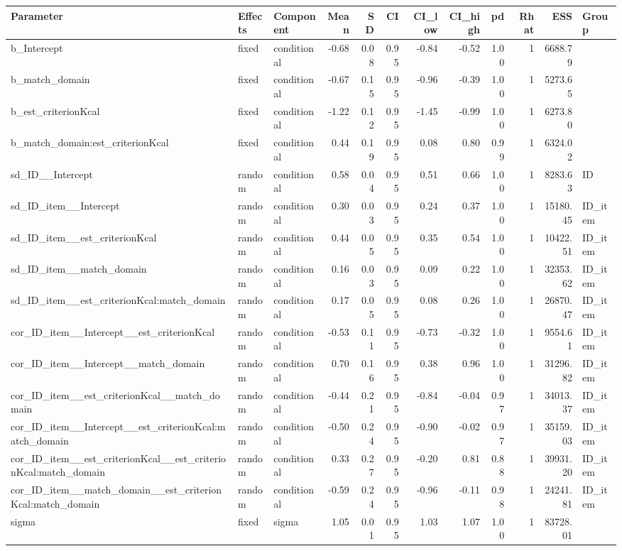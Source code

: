 \documentclass[
  letterpaper,
  DIV=11,
  numbers=noendperiod]{scrartcl}
\begin{document}
\begin{longtable*}[t]{lllrrrrrrrrl}
\toprule
Parameter & Effects & Component & Mean & SD & CI & CI\_low & CI\_high & pd & Rhat & ESS & Group\\
\midrule
b\_Intercept & fixed & conditional & -0.68 & 0.08 & 0.95 & -0.84 & -0.52 & 1.00 & 1 & 6688.79 & \\
b\_match\_domain & fixed & conditional & -0.67 & 0.15 & 0.95 & -0.96 & -0.39 & 1.00 & 1 & 5273.65 & \\
b\_est\_criterionKcal & fixed & conditional & -1.22 & 0.12 & 0.95 & -1.45 & -0.99 & 1.00 & 1 & 6273.80 & \\
b\_match\_domain:est\_criterionKcal & fixed & conditional & 0.44 & 0.19 & 0.95 & 0.08 & 0.80 & 0.99 & 1 & 6324.02 & \\
sd\_ID\_\_Intercept & random & conditional & 0.58 & 0.04 & 0.95 & 0.51 & 0.66 & 1.00 & 1 & 8283.63 & ID\\
\addlinespace
sd\_ID\_item\_\_Intercept & random & conditional & 0.30 & 0.03 & 0.95 & 0.24 & 0.37 & 1.00 & 1 & 15180.45 & ID\_item\\
sd\_ID\_item\_\_est\_criterionKcal & random & conditional & 0.44 & 0.05 & 0.95 & 0.35 & 0.54 & 1.00 & 1 & 10422.51 & ID\_item\\
sd\_ID\_item\_\_match\_domain & random & conditional & 0.16 & 0.03 & 0.95 & 0.09 & 0.22 & 1.00 & 1 & 32353.62 & ID\_item\\
sd\_ID\_item\_\_est\_criterionKcal:match\_domain & random & conditional & 0.17 & 0.05 & 0.95 & 0.08 & 0.26 & 1.00 & 1 & 26870.47 & ID\_item\\
cor\_ID\_item\_\_Intercept\_\_est\_criterionKcal & random & conditional & -0.53 & 0.11 & 0.95 & -0.73 & -0.32 & 1.00 & 1 & 9554.61 & ID\_item\\
\addlinespace
cor\_ID\_item\_\_Intercept\_\_match\_domain & random & conditional & 0.70 & 0.16 & 0.95 & 0.38 & 0.96 & 1.00 & 1 & 31296.82 & ID\_item\\
cor\_ID\_item\_\_est\_criterionKcal\_\_match\_domain & random & conditional & -0.44 & 0.21 & 0.95 & -0.84 & -0.04 & 0.97 & 1 & 34013.37 & ID\_item\\
cor\_ID\_item\_\_Intercept\_\_est\_criterionKcal:match\_domain & random & conditional & -0.50 & 0.24 & 0.95 & -0.90 & -0.02 & 0.97 & 1 & 35159.03 & ID\_item\\
cor\_ID\_item\_\_est\_criterionKcal\_\_est\_criterionKcal:match\_domain & random & conditional & 0.33 & 0.27 & 0.95 & -0.20 & 0.81 & 0.88 & 1 & 39931.20 & ID\_item\\
cor\_ID\_item\_\_match\_domain\_\_est\_criterionKcal:match\_domain & random & conditional & -0.59 & 0.24 & 0.95 & -0.96 & -0.11 & 0.98 & 1 & 24241.81 & ID\_item\\
\addlinespace
sigma & fixed & sigma & 1.05 & 0.01 & 0.95 & 1.03 & 1.07 & 1.00 & 1 & 83728.01 & \\
\bottomrule
\end{longtable*}
\end{document}
